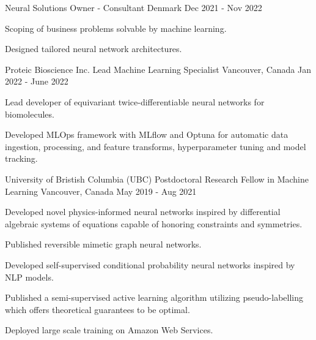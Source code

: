 \begin{cventries}
\vspace{5mm}

  \cventry
  {Neural Solutions} %
  {Owner - Consultant} %
    {Denmark} %
    {Dec 2021 - Nov 2022} %
    {
      \begin{cvitems} %
        \item {Scoping of business problems solvable by machine learning.}
        \item {Designed tailored neural network architectures.}
      \end{cvitems}
    }


  \cventry
  {Proteic Bioscience Inc.} %
  {Lead Machine Learning Specialist} %
    {Vancouver, Canada} %
    {Jan 2022 - June 2022} %
    {
      \begin{cvitems} %
        \item {Lead developer of equivariant twice-differentiable neural networks for biomolecules.}
        \item {Developed MLOps framework with MLflow and Optuna for automatic data ingestion, processing, and feature transforms, hyperparameter tuning and model tracking.}
      \end{cvitems}
    }

  \cventry
  {University of Bristish Columbia (UBC)} %
  {Postdoctoral Research Fellow in Machine Learning} %
    {Vancouver, Canada} %
    {May 2019 - Aug 2021} %
    {
      \begin{cvitems} %
        \item {Developed novel physics-informed neural networks inspired by differential algebraic systems of equations capable of honoring constraints and symmetries.}
        \item {Published reversible mimetic graph neural networks.}
        \item {Developed self-supervised conditional probability neural networks inspired by NLP models.}
        \item {Published a semi-supervised active learning algorithm utilizing pseudo-labelling which offers theoretical guarantees to be optimal.}
        \item {Deployed large scale training on Amazon Web Services.}
      \end{cvitems}
    }


\end{cventries}
